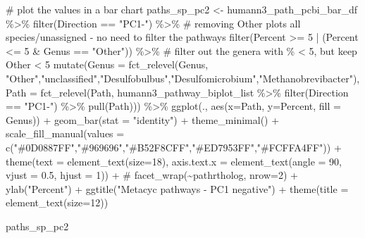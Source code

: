 \documentclass[
  letterpaper,
]{book}
\newenvironment{Shaded}{}{}
\newcommand{\AttributeTok}[1]{\textcolor[rgb]{0.84,0.23,0.29}{#1}}
\newcommand{\CommentTok}[1]{\textcolor[rgb]{0.42,0.45,0.49}{#1}}
\newcommand{\DecValTok}[1]{\textcolor[rgb]{0.00,0.36,0.77}{#1}}
\newcommand{\FloatTok}[1]{\textcolor[rgb]{0.00,0.36,0.77}{#1}}
\newcommand{\FunctionTok}[1]{\textcolor[rgb]{0.44,0.26,0.76}{#1}}
\newcommand{\NormalTok}[1]{\textcolor[rgb]{0.14,0.16,0.18}{#1}}
\newcommand{\OtherTok}[1]{\textcolor[rgb]{0.44,0.26,0.76}{#1}}
\newcommand{\SpecialCharTok}[1]{\textcolor[rgb]{0.00,0.36,0.77}{#1}}
\newcommand{\StringTok}[1]{\textcolor[rgb]{0.01,0.18,0.38}{#1}}
\begin{document}
\begin{Shaded}
\begin{Highlighting}[]
\CommentTok{\# plot the values in a bar chart}
\NormalTok{paths\_sp\_pc2 }\OtherTok{\textless{}{-}}\NormalTok{ humann3\_path\_pcbi\_bar\_df }\SpecialCharTok{\%\textgreater{}\%}
  \FunctionTok{filter}\NormalTok{(Direction }\SpecialCharTok{==} \StringTok{"PC1{-}"}\NormalTok{) }\SpecialCharTok{\%\textgreater{}\%} \CommentTok{\# removing Other plots all species/unassigned {-} no need to filter the pathways}
  \FunctionTok{filter}\NormalTok{(Percent }\SpecialCharTok{\textgreater{}=} \DecValTok{5} \SpecialCharTok{|}\NormalTok{ (Percent }\SpecialCharTok{\textless{}=} \DecValTok{5} \SpecialCharTok{\&}\NormalTok{ Genus }\SpecialCharTok{==} \StringTok{"Other"}\NormalTok{)) }\SpecialCharTok{\%\textgreater{}\%} \CommentTok{\# filter out the genera with \% \textless{} 5, but keep Other \textless{} 5}
  \FunctionTok{mutate}\NormalTok{(}\AttributeTok{Genus =} \FunctionTok{fct\_relevel}\NormalTok{(Genus, }\StringTok{"Other"}\NormalTok{,}\StringTok{"unclassified"}\NormalTok{,}\StringTok{"Desulfobulbus"}\NormalTok{,}\StringTok{"Desulfomicrobium"}\NormalTok{,}\StringTok{"Methanobrevibacter"}\NormalTok{),}
         \AttributeTok{Path =} \FunctionTok{fct\_relevel}\NormalTok{(Path, humann3\_pathway\_biplot\_list }\SpecialCharTok{\%\textgreater{}\%}
                              \FunctionTok{filter}\NormalTok{(Direction }\SpecialCharTok{==} \StringTok{"PC1{-}"}\NormalTok{) }\SpecialCharTok{\%\textgreater{}\%}
                              \FunctionTok{pull}\NormalTok{(Path))) }\SpecialCharTok{\%\textgreater{}\%}
  \FunctionTok{ggplot}\NormalTok{(., }\FunctionTok{aes}\NormalTok{(}\AttributeTok{x=}\NormalTok{Path, }\AttributeTok{y=}\NormalTok{Percent, }\AttributeTok{fill =}\NormalTok{ Genus)) }\SpecialCharTok{+}
    \FunctionTok{geom\_bar}\NormalTok{(}\AttributeTok{stat =} \StringTok{"identity"}\NormalTok{) }\SpecialCharTok{+}
    \FunctionTok{theme\_minimal}\NormalTok{() }\SpecialCharTok{+}
    \FunctionTok{scale\_fill\_manual}\NormalTok{(}\AttributeTok{values =} \FunctionTok{c}\NormalTok{(}\StringTok{"\#0D0887FF"}\NormalTok{,}\StringTok{"\#969696"}\NormalTok{,}\StringTok{"\#B52F8CFF"}\NormalTok{,}\StringTok{"\#ED7953FF"}\NormalTok{,}\StringTok{"\#FCFFA4FF"}\NormalTok{)) }\SpecialCharTok{+}
    \FunctionTok{theme}\NormalTok{(}\AttributeTok{text =} \FunctionTok{element\_text}\NormalTok{(}\AttributeTok{size=}\DecValTok{18}\NormalTok{),}
          \AttributeTok{axis.text.x =} \FunctionTok{element\_text}\NormalTok{(}\AttributeTok{angle =} \DecValTok{90}\NormalTok{, }\AttributeTok{vjust =} \FloatTok{0.5}\NormalTok{, }\AttributeTok{hjust =} \DecValTok{1}\NormalTok{)) }\SpecialCharTok{+}
    \CommentTok{\# facet\_wrap(\textasciitilde{}pathrtholog, nrow=2) +}
    \FunctionTok{ylab}\NormalTok{(}\StringTok{"Percent"}\NormalTok{) }\SpecialCharTok{+}
    \FunctionTok{ggtitle}\NormalTok{(}\StringTok{"Metacyc pathways {-} PC1 negative"}\NormalTok{) }\SpecialCharTok{+}
    \FunctionTok{theme}\NormalTok{(}\AttributeTok{title =} \FunctionTok{element\_text}\NormalTok{(}\AttributeTok{size=}\DecValTok{12}\NormalTok{))}

\NormalTok{paths\_sp\_pc2}
\end{Highlighting}
\end{Shaded}
\end{document}
